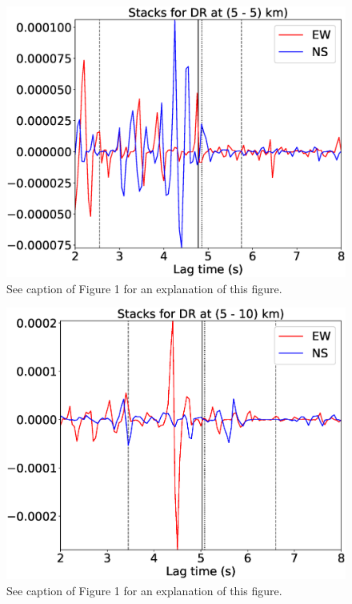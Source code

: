 \documentclass[letterpaper, 12pt]{article}
\begin{document}
\begin{figure}[H]
\includegraphics[width=\linewidth]{figures/intervals/DR_005_005_stacks.eps}
\caption{See caption of Figure 1 for an explanation of this figure.}
\end{figure}

\begin{figure}[H]
\includegraphics[width=\linewidth]{figures/intervals/DR_005_010_stacks.eps}
\caption{See caption of Figure 1 for an explanation of this figure.}
\end{figure}
\end{document}
